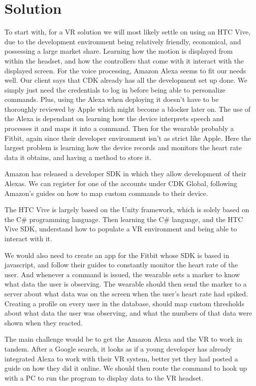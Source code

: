 \documentclass[onecolumn, draftclsnofoot,10pt, compsoc]{IEEEtran}
\begin{document}
\section {Solution}
To start with, for a VR solution we will most likely settle on using an HTC Vive, due to the development environment being relatively friendly, economical, and possessing a large market share. Learning how the motion is displayed from within the headset, and how the controllers that come with it interact with the displayed screen. For the voice processing, Amazon Alexa seems to fit our needs well. Our client says that CDK already has all the development set up done. We simply just need the credentials to log in before being able to personalize commands. Plus, using the Alexa when deploying it doesn’t have to be thoroughly reviewed by Apple which might become a blocker later on. The use of the Alexa is dependant on learning how the device interprets speech and processes it and maps it into a command. Then for the wearable probably a Fitbit, again since their developer environment isn’t as strict like Apple. Here the largest problem is learning how the device records and monitors the heart rate data it obtains, and having a method to store it.

Amazon has released a developer SDK in which they allow development of their Alexas. We can register for one of the accounts under CDK Global, following Amazon’s guides on how to map custom commands to their device.

The HTC Vive is largely based on the Unity framework, which is solely based on the C\# programming language. Then learning the C\# language, and the HTC Vive SDK, understand how to populate a VR environment and being able to interact with it.

We would also need to create an app for the Fitbit whose SDK is based in javascript, and follow their guides to constantly monitor the heart rate of the user. And whenever a command is issued, the wearable sets a marker to know what data the user is observing. The wearable should then send the marker to a server about what data was on the screen when the user’s heart rate had spiked. Creating a profile on every user in the database, should map custom thresholds about what data the user was observing, and what the numbers of that data were shown when they reacted.

The main challenge would be to get the Amazon Alexa and the VR to work in tandem. After a Google search, it looks as if a young developer has already integrated Alexa to work with their VR system, better yet they had posted a guide on how they did it online. We should then route the command to hook up with a PC to run the program to display data to the VR headset.
\end{document}
